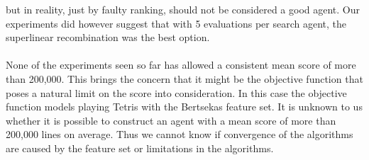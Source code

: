 but in reality, just by faulty ranking, should
not be considered a good agent. Our experiments 
did however suggest that with 5 evaluations per search agent,
the superlinear recombination was the best option.\\
\\
None of the experiments seen so far has allowed a 
consistent mean score of more 
than 200,000. This brings the concern 
that it might be the objective function
that poses a natural limit on the score into consideration.
In this case the objective function
models playing Tetris with the Bertsekas feature set. 
It is unknown to us
whether it is possible to construct an agent 
with a mean score of more than
200,000 lines on average. 
Thus we cannot know if convergence 
of the algorithms are caused by the feature set or limitations in the
algorithms.
